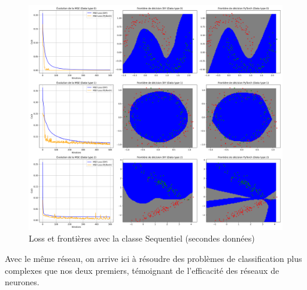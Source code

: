 \documentclass{article}
\begin{document}
\begin{figure}[H]
    \centering
    \includegraphics[width=0.8\linewidth]{Images/sequentiel_2.png}
    \caption{Loss et frontières avec la classe Sequentiel (secondes données)}
	\label{fig:sequentiel2}
\end{figure}
Avec le même réseau, on arrive ici à résoudre des problèmes de classification plus complexes que nos deux premiers, témoignant de l'efficacité des réseaux de neurones.
\end{document}
